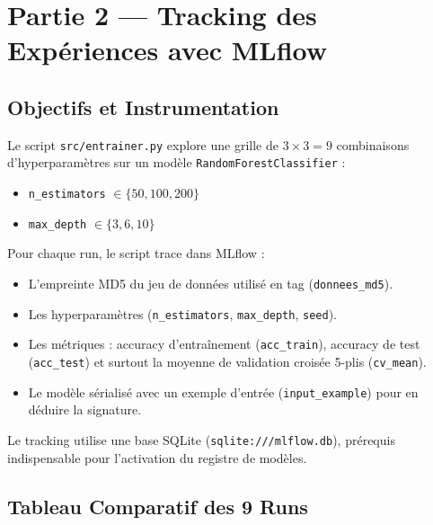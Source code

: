 \documentclass[12pt,a4paper]{article}
\begin{document}
\section{Partie 2 — Tracking des Expériences avec MLflow}

\subsection{Objectifs et Instrumentation}
Le script \texttt{src/entrainer.py} explore une grille de $3 \times 3 = 9$ combinaisons d'hyperparamètres sur un modèle \texttt{RandomForestClassifier} :
\begin{itemize}[leftmargin=*]
  \item \texttt{n\_estimators} $\in \{50, 100, 200\}$
  \item \texttt{max\_depth} $\in \{3, 6, 10\}$
\end{itemize}

Pour chaque run, le script trace dans MLflow :
\begin{itemize}[leftmargin=*]
  \item L'empreinte MD5 du jeu de données utilisé en tag (\texttt{donnees\_md5}).
  \item Les hyperparamètres (\texttt{n\_estimators}, \texttt{max\_depth}, \texttt{seed}).
  \item Les métriques : accuracy d'entraînement (\texttt{acc\_train}), accuracy de test (\texttt{acc\_test}) et surtout la moyenne de validation croisée 5-plis (\texttt{cv\_mean}).
  \item Le modèle sérialisé avec un exemple d'entrée (\texttt{input\_example}) pour en déduire la signature.
\end{itemize}

Le tracking utilise une base SQLite (\texttt{sqlite:///mlflow.db}), prérequis indispensable pour l'activation du registre de modèles.

\subsection{Tableau Comparatif des 9 Runs}
\end{document}
